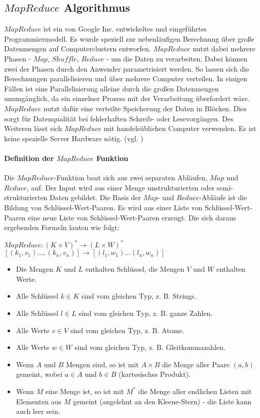 \subsection{$MapReduce$ Algorithmus}
$MapReduce$ ist ein von Google Inc. entwickeltes und eingeführtes Programmiermodell. Es wurde speziell zur nebenläufigen Berechnung über große Datenmengen auf Computerclustern entworfen. $MapReduce$ nutzt dabei mehrere Phasen - $Map$, $Shuffle$, $Reduce$ - um die Daten zu verarbeiten. Dabei können zwei der Phasen durch den Anwender parametrisiert werden. So lassen sich die Berechnungen parallelisieren und über mehrere Computer verteilen. In einigen Fällen ist eine Parallelisierung alleine durch die großen Datenmengen unumgänglich, da ein einzelner Prozess mit der Verarbeitung überfordert wäre.\\ $MapReduce$ nutzt dafür eine verteilte Speicherung der Daten in Blöcken. Dies sorgt für Datenqualität bei fehlerhaften Schreib- oder Lesevorgängen. Des Weiteren lässt sich $MapReduce$ mit handelsüblichen Computer verwenden. Es ist keine spezielle Server Hardware nötig. (vgl. \cite{wik15})

\paragraph{Definition der $MapReduce$ Funktion}$\;$ \\
Die $MapReduce$-Funktion baut sich aus zwei separaten Abläufen, $Map$ und $Reduce$, auf. Der Input wird aus einer Menge unstrukturierten oder semi-strukturierten Daten gebildet. Die Basis der $Map$- und $Reduce$-Abläufe ist die Bildung von Schlüssel-Wert-Paaren. Es wird aus einer Liste von Schlüssel-Wert-Paaren eine neue Liste von Schlüssel-Wert-Paaren erzeugt. Die sich daraus ergebenden Formeln lauten wie folgt:

\begin{center}
    $MapReduce: (K \times V)^\ast \rightarrow (L \times W)^\ast$\\$[(k_1, v_1) \dots ,(k_n, v_n)] \rightarrow [(l_1, w_1) \dots (l_n, w_n)]$
\end{center}
\begin{itemize}
    \item Die Mengen $K$ und $L$ enthalten Schlüssel, die Mengen $V$ und $W$ enthalten Werte.
    \item Alle Schlüssel $k \in K$ sind vom gleichen Typ, z. B. Strings.
    \item Alle Schlüssel $l \in L$ sind vom gleichen Typ, z. B. ganze Zahlen.
    \item Alle Werte $v \in V$ sind vom gleichen Typ, z. B. Atome.
    \item Alle Werte $w \in W$ sind vom gleichen Typ, z. B. Gleitkommazahlen.
    \item Wenn $A$ und $B$ Mengen sind, so ist mit $A\times B$ die Menge aller Paare $(a, b)$ gemeint, wobei $a \in A$ und $b \in B$ (kartesisches Produkt).
    \item Wenn $M$ eine Menge ist, so ist mit $M^*$ die Menge aller endlichen Listen mit Elementen aus $M$ gemeint (angelehnt an den Kleene-Stern) - die Liste kann auch leer sein.
\end{itemize}

